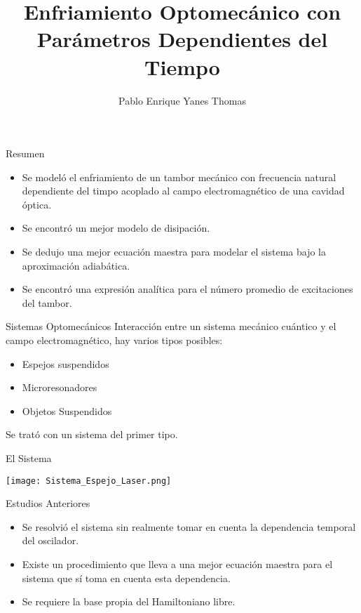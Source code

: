 \documentclass[10pt]{beamer}
\author{Pablo Enrique Yanes Thomas}
\title{Enfriamiento Optomecánico con Parámetros Dependientes del Tiempo}
\institute{IIMAS}
\begin{document}
\begin{frame}
\titlepage
\end{frame}


\begin{frame}{Resumen}

\begin{itemize}
\item Se modeló el enfriamiento de un tambor mecánico con frecuencia natural dependiente del timpo acoplado al campo electromagnético de una cavidad óptica.

\item Se encontró un mejor modelo de disipación.

\item Se dedujo una mejor ecuación maestra para modelar el sistema bajo la aproximación adiabática.

\item Se encontró una expresión analítica para el número promedio de excitaciones del tambor.
\end{itemize}

\end{frame}

\begin{frame}{Sistemas Optomecánicos}
Interacción entre un sistema mecánico cuántico y el campo electromagnético, hay varios tipos posibles:

\begin{itemize}
\item Espejos suspendidos
\item Microresonadores
\item Objetos Suspendidos
\end{itemize}

Se trató con un sistema del primer tipo.

\end{frame}

\begin{frame}{El Sistema}

\texttt{[image: Sistema\_Espejo\_Laser.png]} 

\end{frame}

\begin{frame}{Estudios Anteriores}

\begin{itemize}
\item Se resolvió el sistema sin realmente tomar en cuenta la dependencia temporal del oscilador.

\item Existe un procedimiento que lleva a una mejor ecuación maestra para el sistema que sí toma en cuenta esta dependencia.

\item Se requiere la base propia del Hamiltoniano libre.

\end{itemize}

\end{frame}
\end{document}
